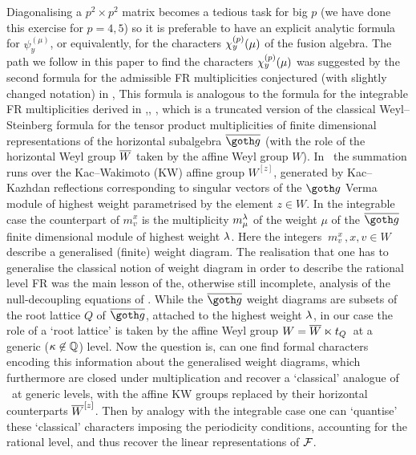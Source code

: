 Diagonalising a $p^2 \times p^2$ matrix becomes a tedious task
for big $p$ (we have done this exercise for $p=4,5$) so it is
preferable to have an explicit analytic formula for $\psi_y^{(\mu)}
$, or equivalently, for the  characters $\chi_y^{(p)}(\mu)$ of the
fusion algebra.  The path we follow in this paper to find the
characters $\chi_y^{(p)} (\mu)$ was suggested by the second
formula for the admissible FR multiplicities  conjectured (with
slightly changed notation) in \FGP,
%
\eqn{}
%
This formula  is analogous to the formula for the integrable FR
multiplicities derived in  \K,\MW, \FGPa, which is a truncated
version of the classical Weyl--Steinberg formula for the tensor
product multiplicities of finite dimensional representations of
the horizontal subalgebra $\bgo$ (with the role of the horizontal
Weyl group $\overline W$ taken by the affine Weyl group $W$). In \ws\ the
summation runs over the Kac--Wakimoto (KW) affine group
$W^{[z]}$, generated by   Kac--Kazhdan reflections corresponding
to  singular vectors of the $\go$ Verma module of highest weight
parametrised by the element $z\in W$. In the integrable case the
counterpart of $m^x_v$ is the multiplicity $m^{\lambda}_{\mu}$   of
the weight $\mu$ of the $\bgo$ finite dimensional module of
highest weight $\lambda$.
Here the integers $ \ m^x_v\,, x,v \in W\,$ 
describe a
generalised (finite) weight diagram.  The realisation that one
has  to generalise the classical notion of weight diagram in
order to describe the rational level FR was the main lesson of
the, otherwise still incomplete,  analysis of the
null-decoupling equations of \FGP. While the $\bgo$ 
weight diagrams 
are  subsets of the root lattice $Q$ of  $\bgo$, attached to the
highest weight $\lambda$, in our case the role of a `root lattice' is
taken by the affine Weyl group $W=\overline W \ltimes t_Q \,$ at a generic
($\kappa \not \in {\Bbb Q}$) level.  Now the question is, can one find
 formal  characters encoding this information about
the generalised weight diagrams, which furthermore are closed
under multiplication and recover  a `classical' analogue of
\ws\ at generic levels, with the affine KW groups replaced by
their horizontal counterparts $\overline W^{[z]}$.  Then by analogy with
the integrable case one can `quantise' these `classical' characters
imposing the periodicity conditions, accounting for the rational
level, and thus recover the linear representations of ${\cal F}$.


